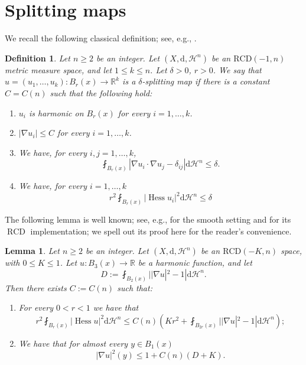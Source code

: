 \documentclass[12pt,a4paper,reqno]{amsart}
\newtheorem{lemma}[theorem]{Lemma}
\newtheorem{definition}[theorem]{Definition}
\renewcommand{\leq}{\leqslant}
\renewcommand{\geq}{\geqslant}
\renewcommand{\d}{\ensuremath{\mathrm d}}
\newcommand{\Hess}{\operatorname{Hess}}
\begin{document}
\appendix

\section{Splitting maps}\label{sec:Splitting}

We recall the following classical definition; see, e.g., \cite{CNAnnMath, ChJiNa, BPSJems, BruePasqualettoSemola, BNSInv}.
\begin{definition}\label{eqn:SplittingMap}
    Let $n\geq 2$ be an integer. Let $(X,\mathrm{d},\mathcal{H}^n)$ be an $\mathrm{RCD}(-1,n)$ metric measure space, and let $1\leq k\leq n$. Let $\delta>0$, $r>0$. We say that $u=(u_1,\ldots,u_k):B_r(x)\to \mathbb R^k$ is a {\rm $\delta$-splitting map} if there is a constant $C=C(n)$ such that the following hold:
    \begin{enumerate}
        \item\label{item1} $u_i$ is harmonic on $B_r(x)$ for every $i=1,\ldots,k$.
        \item\label{item2} $|\nabla u_i|\leq C$ for every $i=1,\ldots,k$.
        \item\label{item3} We have, for every $i,j=1,\ldots,k$,
        \[
        \fint_{B_r(x)} |\nabla u_i\cdot \nabla u_j-\delta_{ij}|\d\mathcal{H}^n \leq \delta.
        \]
        \item\label{item4} We have, for every $i=1,\ldots,k$ 
        \[
        r^2\fint_{B_r(x)} |\Hess u_i|^2\d\mathcal{H}^n \leq \delta
        \]
    \end{enumerate}
\end{definition}
The following lemma is well known; see, e.g.,
\cite[proof of Lemma 3.34, (3.42)--(3.46)]{CNAnnMath}
for the smooth setting and
\cite[proof of Lemma 4.3, (4.14)--(4.22)]{HondaPeng}
for its $\operatorname{RCD}$ implementation; we spell out its proof here for
the reader's convenience.
\begin{lemma}\label{lem:PropertiesHarmonic}
    Let $n\geq 2$ be an integer. Let $(X,\mathrm{d},\mathcal{H}^n)$ be an $\mathrm{RCD}(-K,n)$ space, with $0\leq K\leq 1$. 
    Let $u:B_3(x)\to \mathbb R$ be a harmonic function, and let 
    \[
    D:=\fint_{B_2(x)} ||\nabla u|^2-1|\mathrm{d}\mathcal{H}^n.
    \] 
    Then there exists $C:=C(n)$ such that:
    \begin{enumerate}
        \item For every $0<r<1$ we have that
        \begin{equation}\label{eqn:HessianDecay}
        r^2\fint_{B_r(x)}|\Hess u|^2\mathrm{d}\mathcal{H}^n \leq C(n)\left(Kr^2 + \fint_{B_{2r}(x)}||\nabla u|^2-1|\mathrm{d}\mathcal{H}^n\right);
        \end{equation}
        \item We have that for almost every $y\in B_1(x)$
        \begin{equation}\label{eqn:GradientEstimate}
        |\nabla u|^2(y)\leq 1+C(n)(D+K).
        \end{equation}
    \end{enumerate}
\end{lemma}
\end{document}
